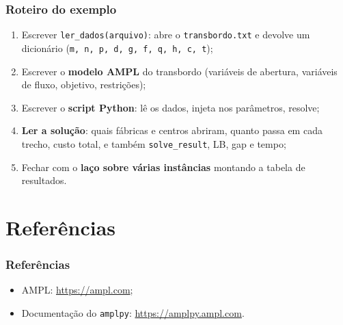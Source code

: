 \documentclass[fleqn]{beamer}
\begin{document}
\begin{frame}
	\frametitle{Roteiro do exemplo}
	\begin{enumerate}
		\item Escrever \texttt{ler\_dados(arquivo)}: abre o
			\texttt{transbordo.txt} e devolve um dicionário
			(\texttt{m, n, p, d, g, f, q, h, c, t});
		\item Escrever o \textbf{modelo AMPL} do transbordo (variáveis de
			abertura, variáveis de fluxo, objetivo, restrições);
		\item Escrever o \textbf{script Python}: lê os dados, injeta nos
			parâmetros, resolve;
		\item \textbf{Ler a solução}: quais fábricas e centros abriram,
			quanto passa em cada trecho, custo total, e também
			\texttt{solve\_result}, LB, gap e tempo;
		\item Fechar com o \textbf{laço sobre várias instâncias}
			montando a tabela de resultados.
	\end{enumerate}
\end{frame}

\section{Referências}

\begin{frame}
	\frametitle{Referências}
	\begin{itemize}
		\item AMPL: \url{https://ampl.com};
		\item Documentação do \texttt{amplpy}: \url{https://amplpy.ampl.com}.
	\end{itemize}
\end{frame}
\end{document}
